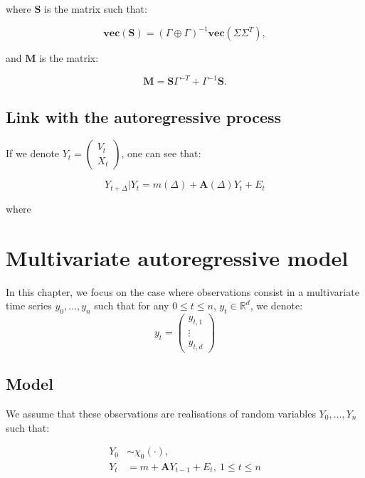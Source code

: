 \documentclass[]{book}
\newcommand{\inv}{^{-1}}
\newcommand{\GpG}{\left( \Gamma \oplus \Gamma \right)}
\newcommand{\Vect}[1]{\textbf{vec}\left(#1 \right)}
\newcommand{\Sinf}{\mathbf{S}}
\newcommand{\M}{\mathbf{M}}
\begin{document}
where \(\Sinf\) is the matrix such that:

\begin{equation*}
\Vect{\Sinf} = \GpG\inv\Vect{\Sigma \Sigma^T}, 
\end{equation*}

and \(\M\) is the matrix:

\begin{equation*}
\M= \Sinf\Gamma^{-T} + \Gamma\inv\Sinf.
\end{equation*}

\section{Link with the autoregressive
process}\label{link-with-the-autoregressive-process}

If we denote \(Y_t = \begin{pmatrix} V_{t} \\ X_{t} \end{pmatrix}\), one
can see that:

\begin{equation*}
Y_{t + \Delta}\vert Y_t = m(\Delta) + \mathbf{A}(\Delta)  Y_t + E_t
\end{equation*}

where

\chapter{Multivariate autoregressive model}\label{simpleAR}

In this chapter, we focus on the case where observations consist in a
multivariate time series \(y_0, \dots, y_n\) such that for any
\(0\leq t \leq n\), \(y_t \in \mathbb{R}^d\), we denote: \[y_t = 
\begin{pmatrix}
y_{t,1}\\
\vdots\\
y_{t, d}
\end{pmatrix}\]

\section{Model}\label{model}

We assume that these observations are realisations of random variables
\(Y_0,\dots, Y_n\) such that:

\begin{align}
Y_0 &\sim \chi_0(\cdot),\nonumber \\
Y_t &= m + \mathbf{A}Y_{t -1} + E_t,~1\leq t \leq n \label{eq:AR-simple}
\end{align}
\end{document}
